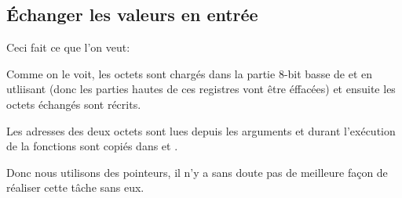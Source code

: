 \subsection{Échanger les valeurs en entrée}

Ceci fait ce que l'on veut:



Comme on le voit, les octets sont chargés dans la partie 8-bit basse de 
et  en utliisant  (donc les parties hautes de ces registres vont
être éffacées) et ensuite les octets échangés sont récrits.



Les adresses des deux octets sont lues depuis les arguments et durant l'exécution
de la fonctions sont copiés dans  et .

Donc nous utilisons des pointeurs, il n'y a sans doute pas de meilleure façon de
réaliser cette tâche sans eux.

